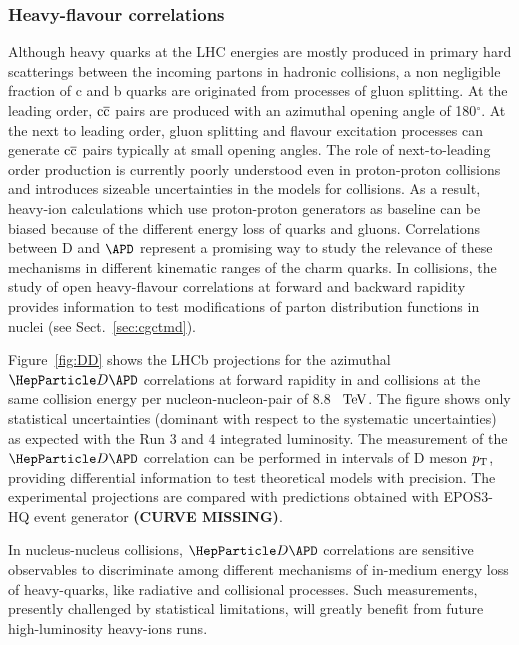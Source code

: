 \subsubsection{Heavy-flavour correlations}
Although heavy quarks at the LHC energies are mostly produced in primary hard scatterings between the incoming partons in hadronic collisions, a non negligible fraction of c and b quarks are originated from processes of gluon splitting. At the leading order, $\rm c\overline c$ pairs are produced with an azimuthal opening angle of 180$^\circ$. At the next to leading order, gluon splitting and flavour excitation processes can generate $\rm c\overline c$ pairs typically at small opening angles. The role of next-to-leading order production is currently poorly understood even in proton-proton collisions \cite{LHCb-PAPER-2012-003,LorentzpaperHF} and introduces sizeable uncertainties in the models for \PbPb collisions. As a result, heavy-ion calculations which use proton-proton generators as baseline can be biased because of the different energy loss of quarks and gluons. Correlations between D and $\APD$ represent a promising way to study the relevance of these mechanisms in different kinematic ranges of the charm quarks. In \pPb collisions, the study of open heavy-flavour correlations at forward and backward rapidity provides information to test modifications of parton distribution functions in nuclei (see Sect.~\ref{sec:cgctmd}). 

Figure~\ref{fig:DD} shows the LHCb projections for the azimuthal ${\PD \APD}$ correlations at forward rapidity in \pp and \pPb collisions at the same collision energy per nucleon-nucleon-pair of 8.8~$~\text{TeV}$. The figure shows only statistical uncertainties (dominant with respect to the systematic uncertainties) as expected with the Run 3 and 4 integrated luminosity. The measurement of the $\PD \APD$ correlation can be performed in intervals of D meson $p\sb{\scriptstyle\mathrm{T}}$, providing differential information to test theoretical models with precision. The experimental projections are compared with predictions obtained with EPOS3-HQ event generator \textbf{(CURVE MISSING)}. 

In nucleus-nucleus collisions, ${\PD \APD}$ correlations are sensitive observables to discriminate among different mechanisms of in-medium energy loss of heavy-quarks, like radiative and collisional processes. Such measurements, presently challenged by statistical limitations, will greatly benefit from future high-luminosity heavy-ions runs. 


